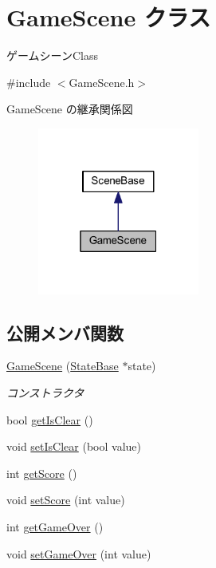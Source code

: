 \hypertarget{class_game_scene}{}\section{Game\+Scene クラス}
\label{class_game_scene}


ゲームシーン\+Class  




{\ttfamily \#include $<$Game\+Scene.\+h$>$}



Game\+Scene の継承関係図\nopagebreak
\begin{figure}[H]
\begin{center}
\leavevmode
\includegraphics[width=151pt]{class_game_scene__inherit__graph}
\end{center}
\end{figure}
\subsection*{公開メンバ関数}
\begin{DoxyCompactItemize}
\item 
\mbox{\hyperlink{class_game_scene_a25e9e82ce85255dac27cd6489751bd40}{Game\+Scene}} (\mbox{\hyperlink{class_scene_base_1_1_state_base}{State\+Base}} $\ast$state)
\begin{DoxyCompactList}\small\item\em コンストラクタ \end{DoxyCompactList}\item 
bool \mbox{\hyperlink{class_game_scene_a56604f01c0fa914660c3d8b788a94405}{get\+Is\+Clear}} ()
\item 
void \mbox{\hyperlink{class_game_scene_a1bd84ecb8d44bd5e57b4a2d772ef1bf9}{set\+Is\+Clear}} (bool value)
\item 
int \mbox{\hyperlink{class_game_scene_a16b26b3b8ea91dcaf762292414bf5d6d}{get\+Score}} ()
\item 
void \mbox{\hyperlink{class_game_scene_a853fefbf82ff85b9f34e325108ae7e3b}{set\+Score}} (int value)
\item 
int \mbox{\hyperlink{class_game_scene_a2f8413f473bc9a937fa02bfd4678d61d}{get\+Game\+Over}} ()
\item 
void \mbox{\hyperlink{class_game_scene_abaefc8ae1bd5625d79da25120ef33a8e}{set\+Game\+Over}} (int value)
\end{DoxyCompactItemize}
